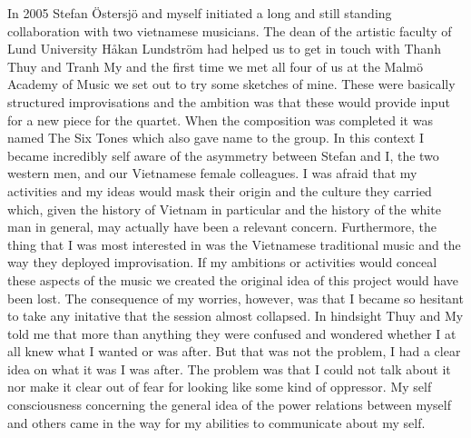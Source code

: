 \documentclass[a4paper]{article}
\begin{document}
In 2005 Stefan Östersjö and myself initiated a long and still standing collaboration with two vietnamese musicians. The dean of the artistic faculty of Lund University Håkan Lundström had helped us to get in touch with Thanh Thuy and Tranh My and the first time we met all four of us at the Malmö Academy of Music we set out to try some sketches of mine. These were basically structured improvisations and the ambition was that these would provide input for a new piece for the quartet. When the composition was completed it was named The Six Tones which also gave name to the group. In this context I became incredibly self aware of the asymmetry between Stefan and I, the two western men, and our Vietnamese female colleagues. I was afraid that my activities and my ideas would mask their origin and the culture they carried which, given the history of Vietnam in particular and the history of the white man in general, may actually have been a relevant concern. Furthermore, the thing that I was most interested in was the Vietnamese traditional music and the way they deployed improvisation. If my ambitions or activities would conceal these aspects of the music we created the original idea of this project would have been lost. The consequence of my worries, however, was that I became so hesitant to take any initative that the session almost collapsed. In hindsight Thuy and My told me that more than anything they were confused and wondered whether I at all knew what I wanted or was after. But that was not the problem, I had a clear idea on what it was I was after. The problem was that I could not talk about it nor make it clear out of fear for looking like some kind of oppressor. My self consciousness concerning the general idea of the power relations between myself and others came in the way for my abilities to communicate about my self.

\end{document}
